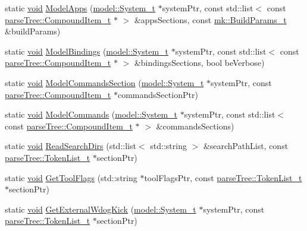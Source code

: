 \begin{DoxyCompactItemize}
\item 
static \hyperlink{_t_e_m_p_l_a_t_e__cdef_8h_ac9c84fa68bbad002983e35ce3663c686}{void} \hyperlink{namespacemodeller_a602fe4cf0dd4000e5ef86109d68580b7}{Model\+Apps} (\hyperlink{structmodel_1_1_system__t}{model\+::\+System\+\_\+t} $\ast$system\+Ptr, const std\+::list$<$ const \hyperlink{structparse_tree_1_1_compound_item__t}{parse\+Tree\+::\+Compound\+Item\+\_\+t} $\ast$ $>$ \&apps\+Sections, const \hyperlink{structmk_1_1_build_params__t}{mk\+::\+Build\+Params\+\_\+t} \&build\+Params)
\item 
static \hyperlink{_t_e_m_p_l_a_t_e__cdef_8h_ac9c84fa68bbad002983e35ce3663c686}{void} \hyperlink{namespacemodeller_a1942a2aca1796064bb3c2dfd6189893c}{Model\+Bindings} (\hyperlink{structmodel_1_1_system__t}{model\+::\+System\+\_\+t} $\ast$system\+Ptr, const std\+::list$<$ const \hyperlink{structparse_tree_1_1_compound_item__t}{parse\+Tree\+::\+Compound\+Item\+\_\+t} $\ast$ $>$ \&bindings\+Sections, bool be\+Verbose)
\item 
static \hyperlink{_t_e_m_p_l_a_t_e__cdef_8h_ac9c84fa68bbad002983e35ce3663c686}{void} \hyperlink{namespacemodeller_a618e4798822c4017460e39a1690b7b5c}{Model\+Commands\+Section} (\hyperlink{structmodel_1_1_system__t}{model\+::\+System\+\_\+t} $\ast$system\+Ptr, const \hyperlink{structparse_tree_1_1_compound_item__t}{parse\+Tree\+::\+Compound\+Item\+\_\+t} $\ast$commands\+Section\+Ptr)
\item 
static \hyperlink{_t_e_m_p_l_a_t_e__cdef_8h_ac9c84fa68bbad002983e35ce3663c686}{void} \hyperlink{namespacemodeller_a59430f7d97bc91bbfdad9b04fb8212b5}{Model\+Commands} (\hyperlink{structmodel_1_1_system__t}{model\+::\+System\+\_\+t} $\ast$system\+Ptr, const std\+::list$<$ const \hyperlink{structparse_tree_1_1_compound_item__t}{parse\+Tree\+::\+Compound\+Item\+\_\+t} $\ast$ $>$ \&commands\+Sections)
\item 
static \hyperlink{_t_e_m_p_l_a_t_e__cdef_8h_ac9c84fa68bbad002983e35ce3663c686}{void} \hyperlink{namespacemodeller_ab12fd2d3256dc14949bbd002313d0187}{Read\+Search\+Dirs} (std\+::list$<$ std\+::string $>$ \&search\+Path\+List, const \hyperlink{structparse_tree_1_1_token_list__t}{parse\+Tree\+::\+Token\+List\+\_\+t} $\ast$section\+Ptr)
\item 
static \hyperlink{_t_e_m_p_l_a_t_e__cdef_8h_ac9c84fa68bbad002983e35ce3663c686}{void} \hyperlink{namespacemodeller_a27b67a3c969cb1ccd7fd616273202bfb}{Get\+Tool\+Flags} (std\+::string $\ast$tool\+Flags\+Ptr, const \hyperlink{structparse_tree_1_1_token_list__t}{parse\+Tree\+::\+Token\+List\+\_\+t} $\ast$section\+Ptr)
\item 
static \hyperlink{_t_e_m_p_l_a_t_e__cdef_8h_ac9c84fa68bbad002983e35ce3663c686}{void} \hyperlink{namespacemodeller_a7fbfc5ded25d1632043f3443093f131e}{Get\+External\+Wdog\+Kick} (\hyperlink{structmodel_1_1_system__t}{model\+::\+System\+\_\+t} $\ast$system\+Ptr, const \hyperlink{structparse_tree_1_1_token_list__t}{parse\+Tree\+::\+Token\+List\+\_\+t} $\ast$section\+Ptr)
\end{DoxyCompactItemize}


